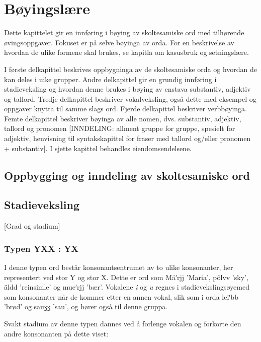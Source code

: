 \chapter{Bøyingslære}

Dette kapittelet gir en innføring i bøying av skoltesamiske ord med tilhørende øvingsoppgaver. Fokuset er på selve bøyinga av orda. For en beskrivelse av hvordan de ulike formene skal brukes, se kapitla om kasusbruk og setningslære.

I første delkapittel beskrives oppbygninga av de skoltesamiske orda og hvordan de kan deles i uike grupper. Andre delkapittel gir en grundig innføring i stadieveksling og hvordan denne brukes i bøying av enstava substantiv, adjektiv og tallord. Tredje delkapittel beskriver vokalveksling, også dette med eksempel og oppgaver knytta til samme slags ord. Fjerde delkapittel beskriver verbbøyinga. Femte delkapittel beskriver bøyinga av alle nomen, dvs. substantiv, adjektiv, tallord og pronomen [INNDELING: allment gruppe for gruppe, spesielt for adjektiv, henvisning til syntakskapittel for fraser med tallord og/eller pronomen + substantiv]. I sjette kapittel behandles eiendomsendelsene.

\section{Oppbygging og inndeling av skoltesamiske ord} \label{inndeling}



\section{Stadieveksling}

[Grad og stadium]

\subsection{Typen YXX : YX}

I denne typen ord består konsonantsentrumet av to ulike konsonanter, her representert ved stor Y og stor X. Dette er ord som Mäʹrjj 'Maria', põlvv 'sky', äldd 'reinsimle' og mueʹrjj 'bær'. Vokalene \emph{i} og \emph{u} regnes i stadievekslingsøyemed som konsonanter når de kommer etter en annen vokal, slik som i orda leiʹbb 'brød' og sauʒʒ 'sau', og hører også til denne gruppa.

Svakt stadium av denne typen dannes ved å forlenge vokalen og forkorte den andre konsonanten på dette viset:

